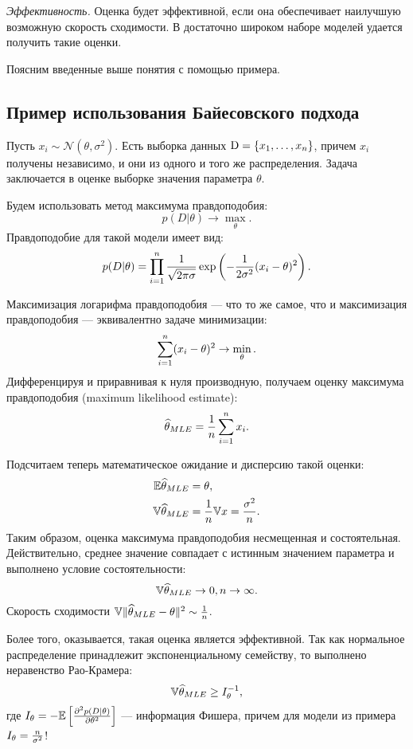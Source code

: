 \emph{Эффективность.} Оценка будет эффективной, если она обеспечивает наилучшую возможную скорость сходимости.
В достаточно широком наборе моделей удается получить такие оценки.

Поясним введенные выше понятия с помощью примера.

\subsection{Пример использования Байесовского подхода}
\begin{example}
Пусть $x_i \sim \mathcal{N}(\theta, \sigma^2)$.
Есть выборка данных $\mathrm{D} = \{x_1, \ldots, x_{n}\}$, причем $x_i$ получены независимо, и они из одного и того же распределения.
Задача заключается в оценке выборке значения параметра $\theta$.

Будем использовать метод максимума правдоподобия:
\[
p(D| \theta) \rightarrow \max_{\theta}.
\]
Правдоподобие для такой модели имеет вид:
\[
p(D| \theta) = \prod_{i = 1}^{n} \frac{1}{\sqrt{2 \pi \sigma}} \exp \left(-\frac{1}{2 \sigma^2} (x_i - \theta)^2 \right).
\]

Максимизация логарифма правдоподобия --- что то же самое, что и максимизация правдоподобия --- эквивалентно задаче минимизации:
\[
\sum_{i = 1}^{n} (x_i - \theta)^2 \rightarrow \min_{\theta}.
\]
Дифференцируя и приравнивая к нуля производную, получаем оценку максимума правдоподобия (maximum likelihood estimate):
\[
\widehat{\theta}_{MLE} = \frac{1}{n} \sum_{i = 1}^{n} x_i.
\]

Подсчитаем теперь математическое ожидание и дисперсию такой оценки:
\begin{align*}
\mathbb{E} \widehat{\theta}_{MLE} &= \theta, \\
\mathbb{V} \widehat{\theta}_{MLE} &= \frac{1}{n} \mathbb{V} x = \frac{\sigma^2}{n}. \\
\end{align*}
Таким образом, оценка максимума правдоподобия несмещенная и состоятельная.
Действительно, среднее значение совпадает с истинным значением параметра и выполнено условие состоятельности:
\[
\mathbb{V} \widehat{\theta}_{MLE} \rightarrow 0, n \rightarrow \infty.
\]
Скорость сходимости $\mathbb{V} \|\widehat{\theta}_{MLE} - \theta\|^2 \sim \frac{1}{n}$.

Более того, оказывается, такая оценка является эффективной.
Так как нормальное распределение принадлежит экспоненциальному семейству, то выполнено неравенство Рао-Крамера:
\[
\mathbb{V} \widehat{\theta}_{MLE} \geq I_{\theta}^{-1},
\]
где $I_{\theta} = - \mathbb{E}  \left[\frac{\partial^2 p(D|\theta)}{\partial \theta^2} \right]$ --- информация Фишера,
причем для модели из примера $I_{\theta} = \frac{n}{\sigma^2}$!


\end{example}
